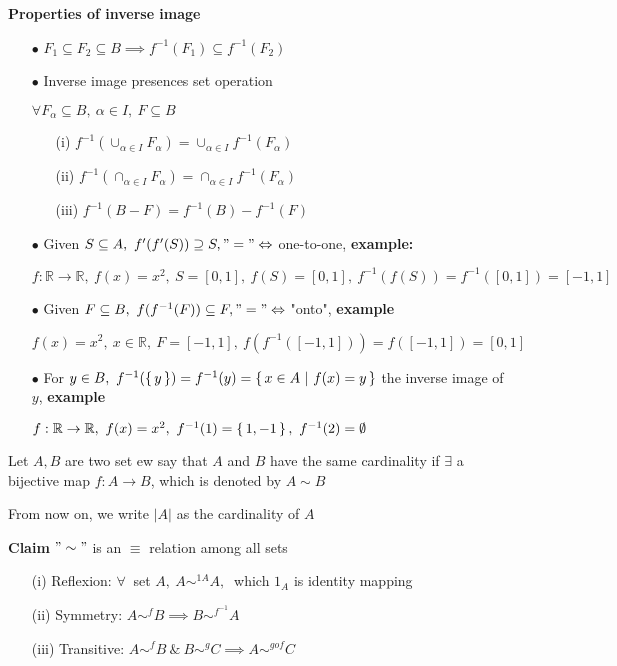 \textbf{Properties of inverse image}

\begin{enumerate}
	\item[$\bullet$] $F_1 \subseteq F_2 \subseteq B \implies f^{-1}(F_1) \subseteq f^{-1}(F_2)$
	\item[$\bullet$] Inverse image presences set operation
		
		$\forall F_{\alpha} \subseteq B,~\alpha \in I,~F\subseteq B$
		\begin{enumerate}
			\item[(i)] $f^{-1}(\cup_{\alpha \in I}F_{\alpha}) = \cup_{\alpha \in I}f^{-1}(F_{\alpha})$
			\item[(ii)] $f^{-1}(\cap_{\alpha \in I}F_{\alpha}) = \cap_{\alpha \in I}f^{-1}(F_{\alpha})$
			\item[(iii)] $f^{-1}(B - F) = f^{-1}(B) - f^{-1}(F) $
		\end{enumerate}
	\item[$\bullet$] Given $S \subseteq A,~f'(f'(S)) \supseteq S, "=" \Leftrightarrow$ one-to-one, \textbf{example:}
	
	$f:\mathbb R \rightarrow \mathbb R,~f(x) = x^2,~S=[0,1],~f(S) = [0,1],~f^{-1}(f(S)) = f^{-1}([0,1]) = [-1,1]$
	
	\item[$\bullet$] Given $F \subseteq B,~f(f^{-1}(F)) \subseteq F, "=" \Leftrightarrow$ "onto", \textbf{example}
	
	$f(x) = x^2,~x \in \mathbb R,~F = [-1,1],~f(f^{-1}([-1,1])) = f([-1,1]) = [0,1]$
	
	\item[$\bullet$] For $y \in B,~f^{-1}(\left\{ \,y \,\right\}) = f^{-1}(y) = \left\{ \,x \in A ~|~ f(x) = y \,\right\}$ the inverse image of $y$, \textbf{example}
	
	$f:\mathbb R \rightarrow \mathbb R,~f(x) = x^2,~f^{-1}(1) = \left\{ \,1,-1 \,\right\},~f^{-1}(2) = \emptyset$
\end{enumerate}

\newpage

\begin{defn}[cardinality]
	Let $A,B$ are two set ew say that $A$ and $B$ have the same cardinality if $\exists$ a bijective map $f:A \rightarrow B$, which is denoted by $A \sim B$
	
	From now on, we write $|A|$ as the cardinality of $A$
\end{defn}

\textbf{Claim} $"\sim"$ is an $\equiv$ relation among all sets

\begin{enumerate}
	\item[(i)] Reflexion: $\forall~$ set $A,~A\sim^{1A} A,~$ which $1_A$ is identity mapping
	\item[(ii)] Symmetry: $A \sim^{f}B \implies B\sim^{f^{-1}} A$
	\item[(iii)] Transitive: $A \sim^{f} B ~\&~ B\sim^{g}C \implies A \sim^{g o f}C$
\end{enumerate}

